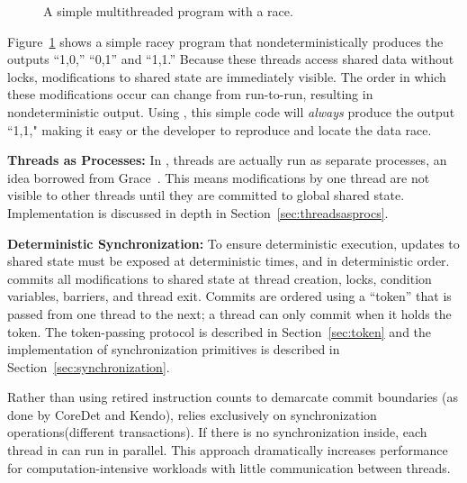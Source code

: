 \label{sec:dthreads-architecture}

\begin{figure}[!ht]
\fbox{
\subfigure{}
\hspace{10pt}
\subfigure{}
\hspace{10pt}
\subfigure{}
}
\caption{A simple multithreaded program with a race.\label{fig:sample}}
\end{figure}

Figure~\ref{fig:sample} shows a simple racey program that nondeterministically produces the outputs ``1,0,'' ``0,1'' and ``1,1.''  Because these threads access shared data without locks, modifications to shared state are immediately visible.  The order in which these modifications occur can change from run-to-run, resulting in nondeterministic output.  
Using \dthreads{}, this simple code will \emph{always} produce the output ``1,1," making it easy or the developer to reproduce and locate the data race.

\textbf{Threads as Processes:}
In \dthreads{}, threads are actually run as separate processes, an idea borrowed from Grace~\cite{grace}.  This means modifications by one thread are not visible to other threads until they are committed to global shared state.  Implementation is discussed in depth in Section~\ref{sec:threadsasprocs}.


\textbf{Deterministic Synchronization:}
To ensure deterministic execution, updates to shared state must be exposed at deterministic times, and in deterministic order.  \dthreads{} commits all modifications to shared state at thread creation, locks, condition variables, barriers, and thread exit.  Commits are ordered using a ``token'' that is passed from one thread to the next; a thread can only commit when it holds the token.  The token-passing protocol is described in Section~\ref{sec:token} and the implementation of synchronization primitives is described in Section~\ref{sec:synchronization}.

Rather than using retired instruction counts to demarcate commit
boundaries (as done by CoreDet and Kendo), \dthreads{} relies
exclusively on synchronization operations(different transactions). 
If there is no synchronization inside, each thread in \dthreads{} can run in
parallel. This approach dramatically increases performance for
computation-intensive workloads with little communication between
threads.

